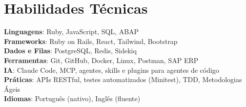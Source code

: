 \documentclass[letterpaper,11pt]{article}
\begin{document}
\section{Habilidades Técnicas}
 \begin{itemize}[leftmargin=0.15in, label={}]
    \small{\item{
     \textbf{Linguagens}{: Ruby, JavaScript, SQL, ABAP} \\
     \textbf{Frameworks}{: Ruby on Rails, React, Tailwind, Bootstrap} \\
     \textbf{Dados e Filas}{: PostgreSQL, Redis, Sidekiq} \\
     \textbf{Ferramentas}{: Git, GitHub, Docker, Linux, Postman, SAP ERP} \\
     \textbf{IA}{: Claude Code, MCP, agentes, skills e plugins para agentes de código} \\
     \textbf{Práticas}{: APIs RESTful, testes automatizados (Minitest), TDD, Metodologias Ágeis} \\
     \textbf{Idiomas}{: Português (nativo), Inglês (fluente)}
    }}
 \end{itemize}
\end{document}
